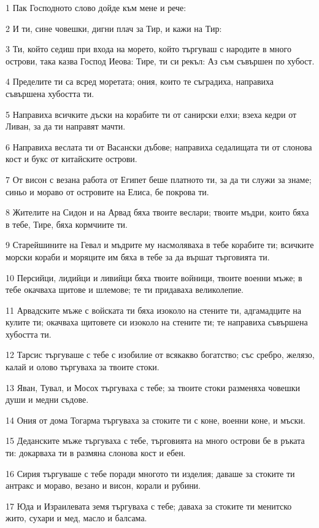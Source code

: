 \par 1 Пак Господното слово дойде към мене и рече:
\par 2 И ти, сине човешки, дигни плач за Тир, и кажи на Тир:
\par 3 Ти, който седиш при входа на морето, който търгуваш с народите в много острови, така казва Господ Иеова: Тире, ти си рекъл: Аз съм съвършен по хубост.
\par 4 Пределите ти са всред моретата; ония, които те съградиха, направиха съвършена хубостта ти.
\par 5 Направиха всичките дъски на корабите ти от санирски елхи; взеха кедри от Ливан, за да ти направят мачти.
\par 6 Направиха веслата ти от Васански дъбове; направиха седалищата ти от слонова кост и букс от китайските острови.
\par 7 От висон с везана работа от Египет беше платното ти, за да ти служи за знаме; синьо и мораво от островите на Елиса, бе покрова ти.
\par 8 Жителите на Сидон и на Арвад бяха твоите веслари; твоите мъдри, които бяха в тебе, Тире, бяха кормчиите ти.
\par 9 Старейшините на Гевал и мъдрите му насмоляваха в тебе корабите ти; всичките морски кораби и моряците им бяха в тебе за да вършат търговията ти.
\par 10 Персийци, лидийци и ливийци бяха твоите войници, твоите военни мъже; в тебе окачваха щитове и шлемове; те ти придаваха великолепие.
\par 11 Арвадските мъже с войската ти бяха изоколо на стените ти, адгамадците на кулите ти; окачваха щитовете си изоколо на стените ти; те направиха съвършена хубостта ти.
\par 12 Тарсис търгуваше с тебе с изобилие от всякакво богатство; със сребро, желязо, калай и олово търгуваха за твоите стоки.
\par 13 Яван, Тувал, и Мосох търгуваха с тебе; за твоите стоки разменяха човешки души и медни съдове.
\par 14 Ония от дома Тогарма търгуваха за стоките ти с коне, военни коне, и мъски.
\par 15 Деданските мъже търгуваха с тебе, търговията на много острови бе в ръката ти: докарваха ти в размяна слонова кост и ебен.
\par 16 Сирия търгуваше с тебе поради многото ти изделия; даваше за стоките ти антракс и мораво, везано и висон, корали и рубини.
\par 17 Юда и Израилевата земя търгуваха с тебе; даваха за стоките ти менитско жито, сухари и мед, масло и балсама.
